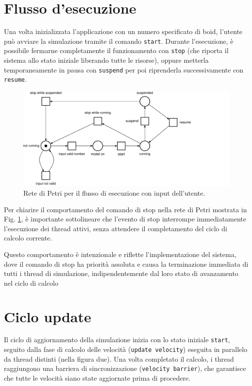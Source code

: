 \documentclass[a4paper,12pt]{report}
\begin{document}
\section{Flusso d'esecuzione}
Una volta inizializzata l'applicazione con un numero specificato di boid, l'utente può avviare la simulazione tramite il comando \texttt{start}. Durante l'esecuzione, è possibile fermarne completamente il funzionamento con \texttt{stop} (che riporta il sistema allo stato iniziale liberando tutte le risorse), oppure metterla temporaneamente in pausa con \texttt{suspend} per poi riprenderla successivamente con \texttt{resume}.
\begin{figure}[h!]
    \centering
    \includegraphics[width=\textwidth]{rete_app_flow.pdf}
    \caption{Rete di Petri per il flusso di esecuzione con input dell'utente.}
    \label{fig:rete_app_flow}
\end{figure}

Per chiarire il comportamento del comando di stop nella rete di Petri mostrata in Fig. \ref{fig:rete_app_flow}, è importante sottolineare che l'evento di stop interrompe immediatamente l'esecuzione dei thread attivi, senza attendere il completamento del ciclo di calcolo corrente.

Questo comportamento è intenzionale e riflette l'implementazione del sistema, dove il comando di stop ha priorità assoluta e causa la terminazione immediata di tutti i thread di simulazione, indipendentemente dal loro stato di avanzamento nel ciclo di calcolo

\section{Ciclo update}
Il ciclo di aggiornamento della simulazione inizia con lo stato iniziale \texttt{start}, seguito dalla fase di calcolo delle velocità (\texttt{update velocity}) eseguita in parallelo da thread distinti (nella figura due). Una volta completato il calcolo, i thread raggiungono una barriera di sincronizzazione (\texttt{velocity barrier}), che garantisce che tutte le velocità siano state aggiornate prima di procedere.
\end{document}
